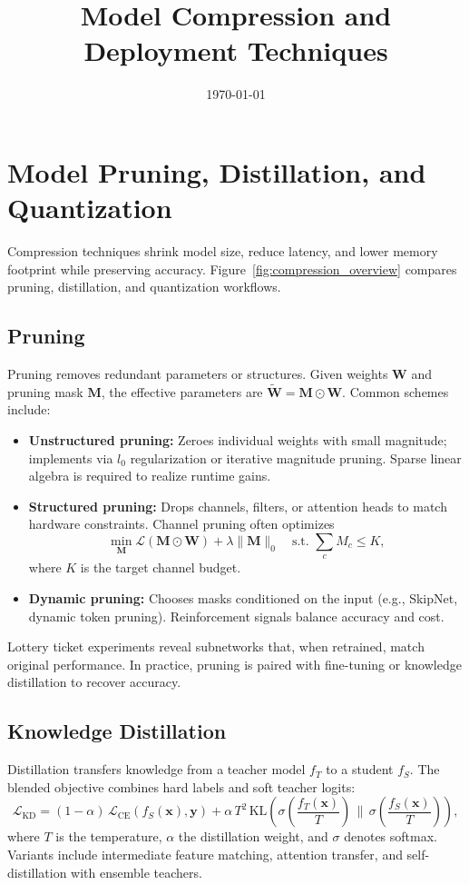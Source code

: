\documentclass{article}
\title{Model Compression and Deployment Techniques}
\author{}
\date{\today}
\begin{document}
\maketitle
\tableofcontents
\FloatBarrier

\section{Model Pruning, Distillation, and Quantization}
Compression techniques shrink model size, reduce latency, and lower memory footprint while preserving accuracy. Figure~\ref{fig:compression_overview} compares pruning, distillation, and quantization workflows.

\subsection{Pruning}
Pruning removes redundant parameters or structures. Given weights $\mathbf{W}$ and pruning mask $\mathbf{M}$, the effective parameters are $\tilde{\mathbf{W}} = \mathbf{M} \odot \mathbf{W}$. Common schemes include:
\begin{itemize}
  \item \textbf{Unstructured pruning:} Zeroes individual weights with small magnitude; implements via $l_0$ regularization or iterative magnitude pruning. Sparse linear algebra is required to realize runtime gains.
  \item \textbf{Structured pruning:} Drops channels, filters, or attention heads to match hardware constraints. Channel pruning often optimizes
  \begin{equation}
    \min_{\mathbf{M}} \mathcal{L}(\mathbf{M} \odot \mathbf{W}) + \lambda \|\mathbf{M}\|_0 \quad \text{s.t. } \sum_{c} M_c \le K,
  \end{equation}
  where $K$ is the target channel budget.
  \item \textbf{Dynamic pruning:} Chooses masks conditioned on the input (e.g., SkipNet, dynamic token pruning). Reinforcement signals balance accuracy and cost.
\end{itemize}
Lottery ticket experiments reveal subnetworks that, when retrained, match original performance. In practice, pruning is paired with fine-tuning or knowledge distillation to recover accuracy.

\subsection{Knowledge Distillation}
Distillation transfers knowledge from a teacher model $f_T$ to a student $f_S$. The blended objective combines hard labels and soft teacher logits:
\begin{equation}
  \mathcal{L}_{\mathrm{KD}} = (1-\alpha)\,\mathcal{L}_{\mathrm{CE}}(f_S(\mathbf{x}), \mathbf{y}) + \alpha\, T^2\, \mathrm{KL}\left(\sigma\left(\frac{f_T(\mathbf{x})}{T}\right) \,\bigg\|\, \sigma\left(\frac{f_S(\mathbf{x})}{T}\right)\right),
\end{equation}
where $T$ is the temperature, $\alpha$ the distillation weight, and $\sigma$ denotes softmax. Variants include intermediate feature matching, attention transfer, and self-distillation with ensemble teachers.
\end{document}
